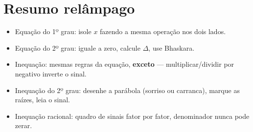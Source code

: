 \documentclass[12pt,a4paper]{article}
\begin{document}
\section*{Resumo relâmpago}
\begin{itemize}[nosep]
  \item Equação do 1º grau: isole $x$ fazendo a mesma operação nos dois lados.
  \item Equação do 2º grau: iguale a zero, calcule $\Delta$, use Bhaskara.
  \item Inequação: mesmas regras da equação, \textbf{exceto} — multiplicar/dividir por negativo inverte o sinal.
  \item Inequação do 2º grau: desenhe a parábola (sorriso ou carranca), marque as raízes, leia o sinal.
  \item Inequação racional: quadro de sinais fator por fator, denominador nunca pode zerar.
\end{itemize}
\end{document}

